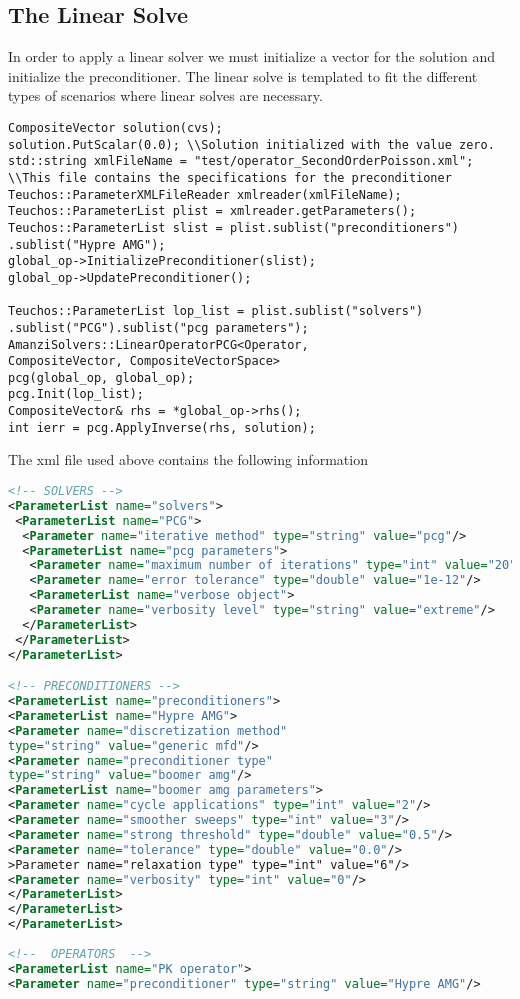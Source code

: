 \subsection{The Linear Solve}\label{Sec:Linear Solve}
%
In order to apply a linear solver we must initialize a vector for the solution and initialize the preconditioner. The linear solve is templated to fit the different types of scenarios where linear solves are necessary.
%
\begin{lstlisting}
CompositeVector solution(cvs);
solution.PutScalar(0.0); \\Solution initialized with the value zero.
std::string xmlFileName = "test/operator_SecondOrderPoisson.xml"; \\This file contains the specifications for the preconditioner
Teuchos::ParameterXMLFileReader xmlreader(xmlFileName);
Teuchos::ParameterList plist = xmlreader.getParameters();
Teuchos::ParameterList slist = plist.sublist("preconditioners")
.sublist("Hypre AMG");
global_op->InitializePreconditioner(slist);
global_op->UpdatePreconditioner();

Teuchos::ParameterList lop_list = plist.sublist("solvers")
.sublist("PCG").sublist("pcg parameters");
AmanziSolvers::LinearOperatorPCG<Operator, 
CompositeVector, CompositeVectorSpace>
pcg(global_op, global_op);
pcg.Init(lop_list);
CompositeVector& rhs = *global_op->rhs();
int ierr = pcg.ApplyInverse(rhs, solution);
\end{lstlisting}
%
The xml file used above contains the following information
%
\begin{lstlisting}[language=xml]
<!-- SOLVERS -->
<ParameterList name="solvers">
 <ParameterList name="PCG">
  <Parameter name="iterative method" type="string" value="pcg"/>
  <ParameterList name="pcg parameters">
   <Parameter name="maximum number of iterations" type="int" value="20"/>
   <Parameter name="error tolerance" type="double" value="1e-12"/>
   <ParameterList name="verbose object">
   <Parameter name="verbosity level" type="string" value="extreme"/>
  </ParameterList>
 </ParameterList>
</ParameterList>

<!-- PRECONDITIONERS -->
<ParameterList name="preconditioners">
<ParameterList name="Hypre AMG">
<Parameter name="discretization method" 
type="string" value="generic mfd"/>
<Parameter name="preconditioner type" 
type="string" value="boomer amg"/>
<ParameterList name="boomer amg parameters">
<Parameter name="cycle applications" type="int" value="2"/>
<Parameter name="smoother sweeps" type="int" value="3"/>
<Parameter name="strong threshold" type="double" value="0.5"/>
<Parameter name="tolerance" type="double" value="0.0"/>
>Parameter name="relaxation type" type="int" value="6"/>
<Parameter name="verbosity" type="int" value="0"/>
</ParameterList>
</ParameterList>
</ParameterList>
	
<!--  OPERATORS  -->
<ParameterList name="PK operator">
<Parameter name="preconditioner" type="string" value="Hypre AMG"/>
\end{lstlisting}
